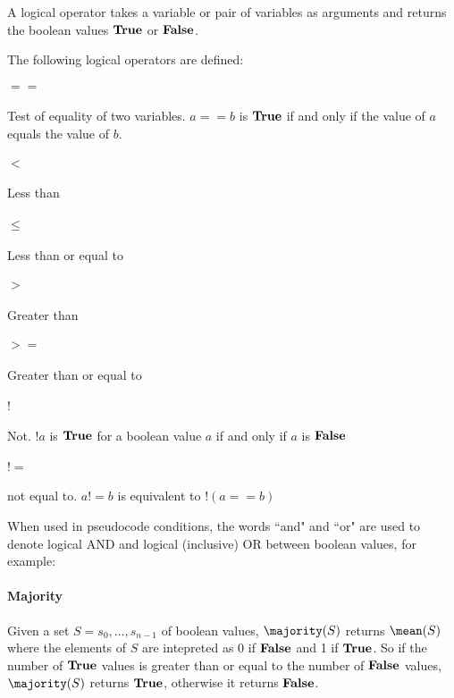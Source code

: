 A logical operator takes a variable or pair of variables as arguments and
returns the boolean values $\text{\bf{True}}$ or $\text{\bf{False}}$.

The following logical operators are defined:

\paragraph*{$==$} Test of equality of two variables. $a==b$ is $\text{\bf{True}}$ if and
only if the value of $a$ equals the value of $b$. 

\paragraph*{$<$}	Less than

\paragraph*{$\leq$} Less than or equal to

\paragraph*{$>$}	Greater than

\paragraph*{$>=$} Greater than or equal to

\paragraph*{$!$} Not. $!a$ is $\text{\bf{True}}$ for a boolean value $a$ if and only if $a$ is $\text{\bf{False}}$

\paragraph*{$!=$} not equal to. $a!=b$ is equivalent to $!(a==b)$

When used in pseudocode conditions, the words ``and" and ``or" are used to denote logical AND
and logical (inclusive) OR between boolean values, for example:

\begin{pseudo*}
    \bsCODE{\hdots}
\bsEND
\end{pseudo*}

\paragraph*{Majority} Given a set $S=s_0, \hdots, s_{n-1}$ of boolean values, $\majority(S)$ 
returns $\mean(S)$ where the elements of $S$ are intepreted as $0$ if $\text{\bf{False}}$ and 1 if $\text{\bf{True}}$.
So if the number of $\text{\bf{True}}$ values is greater than or equal to the number of $\text{\bf{False}}$ values, $\majority(S)$ returns
$\text{\bf{True}}$, otherwise it returns $\text{\bf{False}}$.